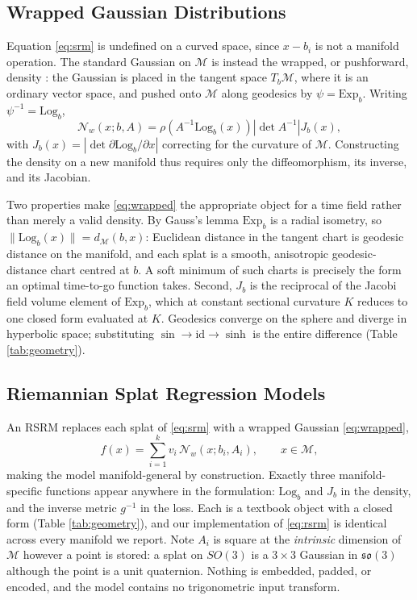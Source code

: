\subsection{Wrapped Gaussian Distributions}

Equation \eqref{eq:srm} is undefined on a curved space, since $x - b_i$ is not a manifold operation. The standard Gaussian on $\mathcal{M}$ is instead the wrapped, or pushforward, density \cite{ManifoldBook-Ch4}: the Gaussian is placed in the tangent space $T_b\mathcal{M}$, where it is an ordinary vector space, and pushed onto $\mathcal{M}$ along geodesics by $\psi = \mathrm{Exp}_b$. Writing $\psi^{-1} = \mathrm{Log}_b$,
\begin{equation}
    \mathcal{N}_w(x; b, A) = \rho\!\left(A^{-1}\mathrm{Log}_b(x)\right) \left| \det A^{-1} \right| J_b(x),
    \label{eq:wrapped}
\end{equation}
with $J_b(x) = \left| \det \partial \mathrm{Log}_b / \partial x \right|$ correcting for the curvature of $\mathcal{M}$. Constructing the density on a new manifold thus requires only the diffeomorphism, its inverse, and its Jacobian.

Two properties make \eqref{eq:wrapped} the appropriate object for a time field rather than merely a valid density. By Gauss's lemma $\mathrm{Exp}_b$ is a radial isometry, so $\|\mathrm{Log}_b(x)\| = d_\mathcal{M}(b,x)$: Euclidean distance in the tangent chart is geodesic distance on the manifold, and each splat is a smooth, anisotropic geodesic-distance chart centred at $b$. A soft minimum of such charts is precisely the form an optimal time-to-go function takes. Second, $J_b$ is the reciprocal of the Jacobi field volume element of $\mathrm{Exp}_b$, which at constant sectional curvature $K$ reduces to one closed form evaluated at $K$. Geodesics converge on the sphere and diverge in hyperbolic space; substituting $\sin \rightarrow \mathrm{id} \rightarrow \sinh$ is the entire difference (Table \ref{tab:geometry}).

\subsection{Riemannian Splat Regression Models}

An \ac{RSRM} replaces each splat of \eqref{eq:srm} with a wrapped Gaussian \eqref{eq:wrapped},
\begin{equation}
    f(x) = \sum_{i=1}^{k} v_i \, \mathcal{N}_w(x; b_i, A_i), \qquad x \in \mathcal{M},
    \label{eq:rsrm}
\end{equation}
making the model manifold-general by construction. Exactly three manifold-specific functions appear anywhere in the formulation: $\mathrm{Log}_b$ and $J_b$ in the density, and the inverse metric $g^{-1}$ in the loss. Each is a textbook object with a closed form (Table \ref{tab:geometry}), and our implementation of \eqref{eq:rsrm} is identical across every manifold we report. Note $A_i$ is square at the \emph{intrinsic} dimension of $\mathcal{M}$ however a point is stored: a splat on $SO(3)$ is a $3\times3$ Gaussian in $\mathfrak{so}(3)$ although the point is a unit quaternion. Nothing is embedded, padded, or encoded, and the model contains no trigonometric input transform.

